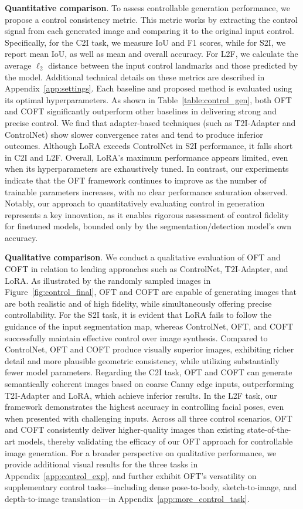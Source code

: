 \textbf{Quantitative comparison}. To assess controllable generation performance, we propose a control consistency metric. This metric works by extracting the control signal from each generated image and comparing it to the original input control. Specifically, for the C2I task, we measure IoU and F1 scores, while for S2I, we report mean IoU, as well as mean and overall accuracy. For L2F, we calculate the average $\ell_2$ distance between the input control landmarks and those predicted by the model. Additional technical details on these metrics are described in Appendix~\ref{app:settings}. Each baseline and proposed method is evaluated using its optimal hyperparameters. As shown in Table~\ref{table:control_gen}, both OFT and COFT significantly outperform other baselines in delivering strong and precise control. We find that adapter-based techniques (such as T2I-Adapter and ControlNet) show slower convergence rates and tend to produce inferior outcomes. Although LoRA exceeds ControlNet in S2I performance, it falls short in C2I and L2F. Overall, LoRA's maximum performance appears limited, even when its hyperparameters are exhaustively tuned. In contrast, our experiments indicate that the OFT framework continues to improve as the number of trainable parameters increases, with no clear performance saturation observed. Notably, our approach to quantitatively evaluating control in generation represents a key innovation, as it enables rigorous assessment of control fidelity for finetuned models, bounded only by the segmentation/detection model’s own accuracy.

\textbf{Qualitative comparison}. We conduct a qualitative evaluation of OFT and COFT in relation to leading approaches such as ControlNet, T2I-Adapter, and LoRA. As illustrated by the randomly sampled images in Figure~\ref{fig:control_final}, OFT and COFT are capable of generating images that are both realistic and of high fidelity, while simultaneously offering precise controllability. For the S2I task, it is evident that LoRA fails to follow the guidance of the input segmentation map, whereas ControlNet, OFT, and COFT successfully maintain effective control over image synthesis. Compared to ControlNet, OFT and COFT produce visually superior images, exhibiting richer detail and more plausible geometric consistency, while utilizing substantially fewer model parameters. Regarding the C2I task, OFT and COFT can generate semantically coherent images based on coarse Canny edge inputs, outperforming T2I-Adapter and LoRA, which achieve inferior results. In the L2F task, our framework demonstrates the highest accuracy in controlling facial poses, even when presented with challenging inputs. Across all three control scenarios, OFT and COFT consistently deliver higher-quality images than existing state-of-the-art models, thereby validating the efficacy of our OFT approach for controllable image generation. For a broader perspective on qualitative performance, we provide additional visual results for the three tasks in Appendix~\ref{app:control_exp}, and further exhibit OFT’s versatility on supplementary control tasks—including dense pose-to-body, sketch-to-image, and depth-to-image translation—in Appendix~\ref{app:more_control_task}.

